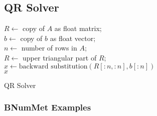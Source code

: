 \subsection*{QR Solver}
\begin{algorithm}[H]
\label{alg:QR Solver}
\SetAlgoLined
\DontPrintSemicolon
{}
$R \gets$ copy of $A$ as float matrix;\\
$b \gets$ copy of $b$ as float vector;\\
$n \gets$ number of rows in $A$;\\
$R \gets$ upper triangular part of $R$;\\
$x \gets \text{backward substitution}(R[:n,:n], b[:n])$\\
\Return $x$
\caption{QR Solver}

\end{algorithm}
\subsubsection*{BNumMet Examples}
